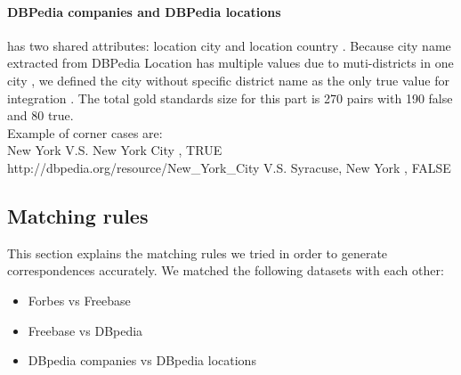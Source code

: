 \paragraph{DBPedia companies and DBPedia locations} has two shared attributes: location city and location country . Because city name extracted from DBPedia Location has multiple values due to muti-districts in one city , we defined the city without specific district name as the only true value for integration . The total gold standards size for this part is 270 pairs with 190 false and 80 true.\\
Example of corner cases are: \\
New York V.S. New York City , TRUE  \\
http://dbpedia.org/resource/New\_York\_City V.S. Syracuse, New York , FALSE

\newpage
\subsection{Matching rules}
This section explains the matching rules we tried in order to generate correspondences accurately. We matched the following datasets with each other:
\begin{itemize}[noitemsep,topsep=0pt,parsep=0pt,partopsep=0pt]
\item Forbes vs Freebase
\item Freebase vs DBpedia
\item DBpedia companies vs DBpedia locations
\end{itemize}



